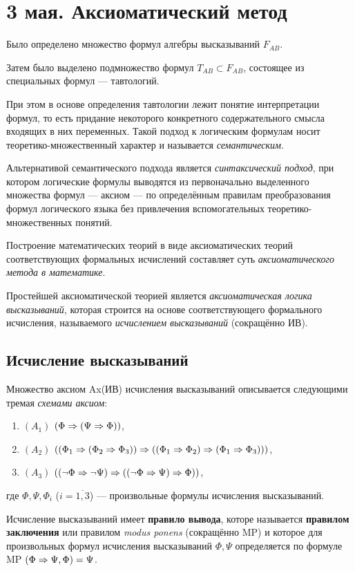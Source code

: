 \chapter{3 мая. Аксиоматический метод}
Было определено множество формул алгебры высказываний $F_{AB}$.

Затем было выделено подмножество формул $T_{AB} \subset F_{AB}$, состоящее из специальных формул --- тавтологий.

При этом в основе определения тавтологии лежит понятие интерпретации формул, то есть придание некоторого конкретного содержательного смысла входящих в них переменных. Такой подход к логическим формулам носит теоретико-множественный характер и называется \textit{семантическим}.

Альтернативой семантического подхода является \textit{синтаксический подход}, при котором логические формулы выводятся из первоначально выделенного множества формул --- аксиом --- по определённым правилам преобразования формул логического языка без привлечения вспомогательных теоретико-множественных понятий.

Построение математических теорий в виде аксиоматических теорий соответствующих формальных исчислений составляет суть \textit{аксиоматического метода в математике}.

Простейшей аксиоматической теорией является \textit{аксиоматическая логика высказываний}, которая строится на основе соответствующего формального исчисления, называемого \textit{исчислением высказываний} (сокращённо ИВ).

\section{Исчисление высказываний}
Множество аксиом Ax(ИВ) исчисления высказываний описывается следующими тремая \textit{схемами аксиом}:
\begin{enumerate}
    \item $(A_1)$ $(\Phi \Rightarrow (\Psi \Rightarrow \Phi))$,
    \item $(A_2)$ $((\Phi_1 \Rightarrow (\Phi_2 \Rightarrow \Phi_3)) \Rightarrow ((\Phi_1 \Rightarrow \Phi_2) \Rightarrow (\Phi_1 \Rightarrow \Phi_3)))$,
    \item $(A_3)$ $((\lnot \Phi \Rightarrow \lnot \Psi)\Rightarrow ((\lnot \Phi \Rightarrow \Psi)\Rightarrow \Phi))$,
\end{enumerate}
где $\Phi, \Psi, \Phi_i$ ($i = \overline{1,3}$) --- произвольные формулы исчисления высказываний.

Исчисление высказываний имеет \textbf{правило вывода}, которе называется \textbf{правилом заключения} или правилом \textit{modus ponens} (сокращённо MP) и которое для произвольных формул исчисления высказываний $\Phi, \Psi$ определяется по формуле MP $(\Phi \Rightarrow \Psi, \Phi) = \Psi$.

